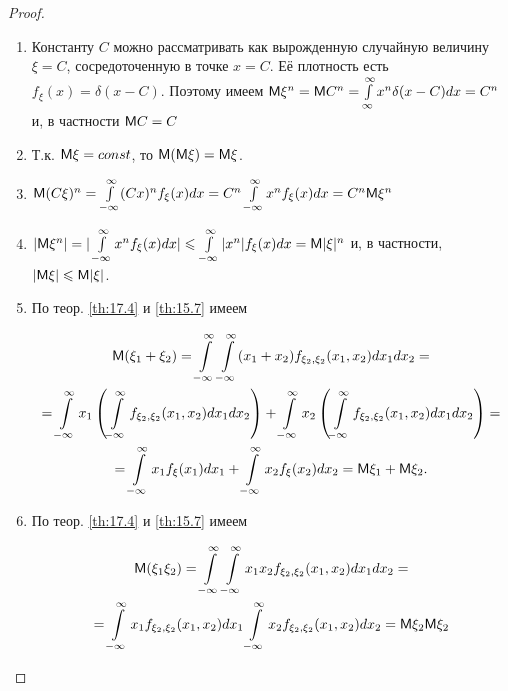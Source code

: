 \begin{proof}
	\begin{enumerate}
		\item Константу $C$ можно рассматривать как вырожденную случайную величину $\xi = C$, сосредоточенную в точке $x = C$. Её плотность есть $f_{\xi}(x)=\delta(x-C)$. Поэтому имеем $\mathsf{M}\xi^n=\mathsf{M} C^n=\int\limits^{\infty}_{\infty} x^n\delta(x-C)dx=C^n$ и, в частности $\mathsf{M} C=C$

		\item Т.к. $\mathsf{M}\xi=const$, то $\mathsf{M}(\mathsf{M}\xi)=\mathsf{M}\xi$.

		\item $\mathsf{M}(C\xi)^n=\int\limits^{\infty}_{-\infty}(Cx)^nf_{\xi}(x)dx=C^n\int\limits^{\infty}_{-\infty}x^nf_{\xi}(x)dx=C^n\mathsf{M} \xi^n$
		
		\item $|\mathsf{M}\xi^n|=|\int\limits^{\infty}_{-\infty}x^nf_{\xi}(x)dx|\leqslant\int\limits^{\infty}_{-\infty}|x^n|f_{\xi}(x)dx=
		\mathsf{M}|\xi|^n$ и, в частности, $|\mathsf{M}\xi|\leqslant\mathsf{M}|\xi|$.

		\item По теор. \ref{th:17.4} и \ref{th:15.7} имеем

			\begin{gather*}
				\mathsf{M}(\xi_1+\xi_2)=
				\int\limits^{\infty}_{-\infty}
				\int\limits^{\infty}_{-\infty}
				(x_1+x_2)
				f_{\xi_2,\xi_2}(x_1,x_2)dx_1dx_2
				=\\=
				\int\limits^{\infty}_{-\infty}
				x_1
				\left(\int\limits^{\infty}_{-\infty} 
				f_{\xi_2,\xi_2}(x_1,x_2)dx_1dx_2
				\right)
				+
				\int\limits^{\infty}_{-\infty}
				x_2
				\left(\int\limits^{\infty}_{-\infty} 
				f_{\xi_2,\xi_2}(x_1,x_2)dx_1dx_2
				\right)
				=\\=
				\int\limits^{\infty}_{-\infty}
				x_1 f_{\xi}(x_1)dx_1+
				\int\limits^{\infty}_{-\infty}
				x_2 f_{\xi}(x_2)dx_2=
				\mathsf{M}\xi_1+\mathsf{M}\xi_2.
			\end{gather*}
		\item По теор. \ref{th:17.4} и \ref{th:15.7} имеем

			\begin{gather*}
				\mathsf{M}(\xi_1\xi_2)=
				\int\limits^{\infty}_{-\infty}\int\limits^{\infty}_{-\infty}
				x_1x_2f_{\xi_2,\xi_2}(x_1,x_2)dx_1dx_2
				=\\=
				\int\limits^{\infty}_{-\infty}
				x_1f_{\xi_2,\xi_2}(x_1,x_2)dx_1 
				\int\limits^{\infty}_{-\infty}
				x_2f_{\xi_2,\xi_2}(x_1,x_2)dx_2=
				\mathsf{M}\xi_2\mathsf{M}\xi_2
			\end{gather*}
	\end{enumerate}
\end{proof}

